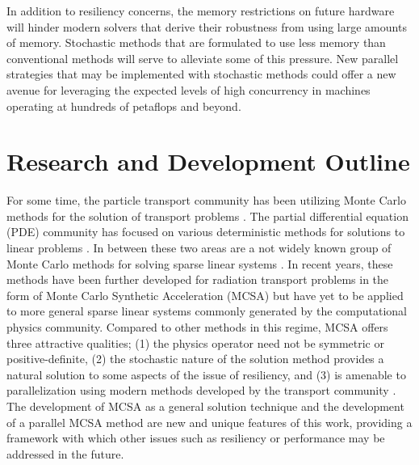 In addition to resiliency concerns, the memory restrictions on future
hardware will hinder modern solvers that derive their robustness from
using large amounts of memory. Stochastic methods that are formulated
to use less memory than conventional methods will serve to alleviate
some of this pressure. New parallel strategies that may
be implemented with stochastic methods could offer a new avenue for
leveraging the expected levels of high concurrency in machines
operating at hundreds of petaflops and beyond.

\section{Research and Development Outline}
\label{sec:research_outline}
For some time, the particle transport community has been utilizing
Monte Carlo methods for the solution of transport problems
\cite{lewis_computational_1993}. The partial differential equation
(PDE) community has focused on various deterministic methods for
solutions to linear problems \cite{saad_iterative_2003,
  kelley_iterative_1995}. In between these two areas are a not widely
known group of Monte Carlo methods for solving sparse linear systems
\cite{forsythe_matrix_1950, hammersley_monte_1964,
  halton_sequential_1962, halton_sequential_1994}. In recent years,
these methods have been further developed for radiation transport
problems in the form of Monte Carlo Synthetic Acceleration (MCSA)
\cite{evans_monte_2009, evans_monte_2012} but have yet to be applied
to more general sparse linear systems commonly generated by the
computational physics community. Compared to other methods in this
regime, MCSA offers three attractive qualities; (1) the physics
operator need not be symmetric or positive-definite, (2) the
stochastic nature of the solution method provides a natural solution
to some aspects of the issue of resiliency, and (3) is amenable to
parallelization using modern methods developed by the transport
community \cite{wagner_hybrid_2010}. The development of MCSA as a
general solution technique and the development of a parallel MCSA
method are new and unique features of this work, providing a framework
with which other issues such as resiliency or performance may be
addressed in the future.

